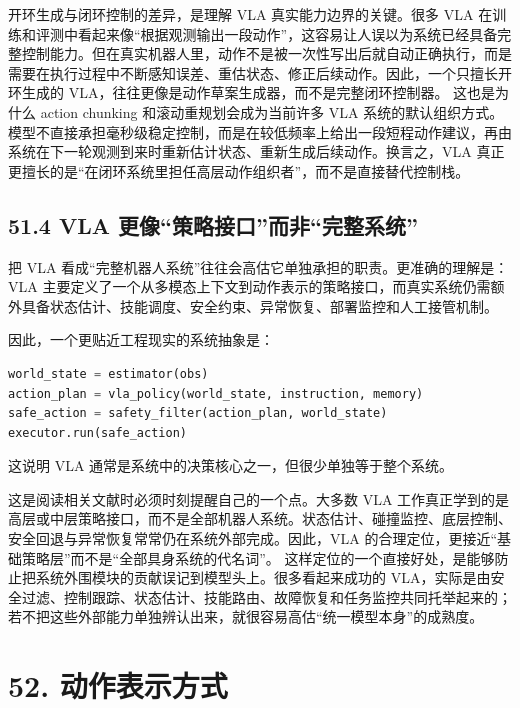 开环生成与闭环控制的差异，是理解 VLA 真实能力边界的关键。很多 VLA 在训练和评测中看起来像“根据观测输出一段动作”，这容易让人误以为系统已经具备完整控制能力。但在真实机器人里，动作不是被一次性写出后就自动正确执行，而是需要在执行过程中不断感知误差、重估状态、修正后续动作。因此，一个只擅长开环生成的 VLA，往往更像是动作草案生成器，而不是完整闭环控制器。 这也是为什么 action chunking 和滚动重规划会成为当前许多 VLA 系统的默认组织方式。模型不直接承担毫秒级稳定控制，而是在较低频率上给出一段短程动作建议，再由系统在下一轮观测到来时重新估计状态、重新生成后续动作。换言之，VLA 真正更擅长的是“在闭环系统里担任高层动作组织者”，而不是直接替代控制栈。

\subsection*{51.4 VLA 更像“策略接口”而非“完整系统”}


把 VLA 看成“完整机器人系统”往往会高估它单独承担的职责。更准确的理解是：VLA 主要定义了一个从多模态上下文到动作表示的策略接口，而真实系统仍需额外具备状态估计、技能调度、安全约束、异常恢复、部署监控和人工接管机制。

因此，一个更贴近工程现实的系统抽象是：

\begin{lstlisting}[language=python]
world_state = estimator(obs)
action_plan = vla_policy(world_state, instruction, memory)
safe_action = safety_filter(action_plan, world_state)
executor.run(safe_action)
\end{lstlisting}

这说明 VLA 通常是系统中的决策核心之一，但很少单独等于整个系统。

这是阅读相关文献时必须时刻提醒自己的一个点。大多数 VLA 工作真正学到的是高层或中层策略接口，而不是全部机器人系统。状态估计、碰撞监控、底层控制、安全回退与异常恢复常常仍在系统外部完成。因此，VLA 的合理定位，更接近“基础策略层”而不是“全部具身系统的代名词”。 这样定位的一个直接好处，是能够防止把系统外围模块的贡献误记到模型头上。很多看起来成功的 VLA，实际是由安全过滤、控制跟踪、状态估计、技能路由、故障恢复和任务监控共同托举起来的；若不把这些外部能力单独辨认出来，就很容易高估“统一模型本身”的成熟度。

\section*{52. 动作表示方式}

